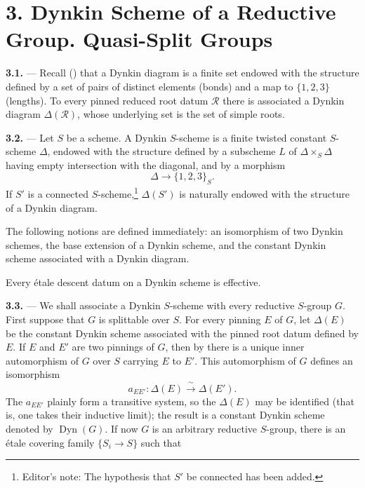 \section*{3. Dynkin Scheme of a Reductive Group. Quasi-Split Groups}

\medskip\noindent\textbf{3.1.} ---
Recall () that a Dynkin diagram is a finite set endowed
with the structure defined by a set of pairs of distinct elements
(bonds) and a map to \(\{1,2,3\}\) (lengths). To every pinned reduced
root datum \(\mathscr R\) there is associated a Dynkin diagram
\(\Delta(\mathscr R)\), whose underlying set is the set of simple
roots.

\medskip\noindent\textbf{3.2.} ---
Let \(S\) be a scheme. A Dynkin \(S\)-scheme is a finite twisted
constant \(S\)-scheme \(\Delta\), endowed with the structure defined
by a subscheme \(L\) of \(\Delta\times_S\Delta\) having empty
intersection with the diagonal, and by a morphism
\[
  \Delta\longrightarrow\{1,2,3\}_S.
\]
If \(S'\) is a connected \(S\)-scheme,\footnote{Editor's note: The
hypothesis that \(S'\) be connected has been added.}
\(\Delta(S')\) is naturally endowed with the structure of a Dynkin
diagram.

The following notions are defined immediately: an isomorphism of two
Dynkin schemes, the base extension of a Dynkin scheme, and the
constant Dynkin scheme associated with a Dynkin diagram.

Every étale descent datum on a Dynkin scheme is effective.

\medskip\noindent\textbf{3.3.} ---
We shall associate a Dynkin \(S\)-scheme with every reductive
\(S\)-group \(G\). First suppose that \(G\) is splittable over \(S\).
For every pinning \(E\) of \(G\), let \(\Delta(E)\) be the constant
Dynkin scheme associated with the pinned root datum defined by \(E\).
If \(E\) and \(E'\) are two pinnings of \(G\), then by  there is
a unique inner automorphism of \(G\) over \(S\) carrying \(E\) to
\(E'\). This automorphism of \(G\) defines an isomorphism
\[
  a_{EE'}:\Delta(E)\xrightarrow{\ \sim\ }\Delta(E').
\]
The \(a_{EE'}\) plainly form a transitive system, so the
\(\Delta(E)\) may be identified (that is, one takes their inductive
limit); the result is a constant Dynkin scheme denoted by
\(\operatorname{Dyn}(G)\). If now \(G\) is an arbitrary reductive
\(S\)-group, there is an étale covering family \(\{S_i\to S\}\)
such that

